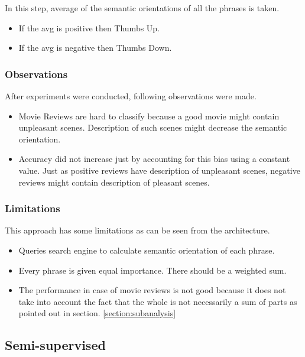 In this step, average of the semantic orientations of all the phrases is taken.

\begin{itemize}
  \item If the avg is positive then Thumbs Up.
  \item If the avg is negative then Thumbs Down.
\end{itemize}

\subsubsection*{Observations}

After experiments were conducted, following observations were made.

\begin{itemize}
 \item Movie Reviews are hard to classify because a good movie might contain unpleasant scenes. Description of such scenes might decrease the
	semantic orientation.
 \item Accuracy did not increase just by accounting for this bias using a constant value. Just as positive reviews have description of unpleasant scenes, negative reviews might
	contain description of pleasant scenes.

\end{itemize}

\subsubsection*{Limitations}

This approach has some limitations as can be seen from the architecture. 

\begin{itemize}
 \item Queries search engine to calculate semantic orientation of each phrase.
 \item Every phrase is given equal importance. There should be a weighted sum.
 \item The performance in case of movie reviews is not good because it does not take into account the fact that the whole is not
	necessarily a sum of parts as pointed out in section. \ref{section:subanalysis}
\end{itemize}

\subsection{Semi-supervised}


